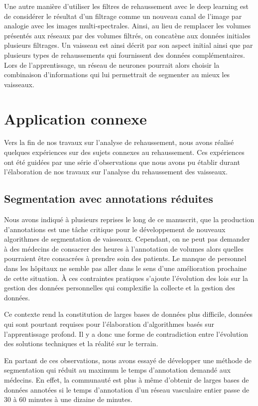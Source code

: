Une autre manière d'utiliser les filtres de rehaussement avec le deep learning est de considérer le résultat d'un filtrage comme un nouveau canal de l’image par analogie avec les images multi-spectrales. Ainsi, au lieu de remplacer les volumes présentés aux réseaux par des volumes filtrés, on concatène aux données initiales plusieurs filtrages. Un vaisseau est ainsi décrit par son aspect initial ainsi que par plusieurs types de rehaussements qui fournissent des données complémentaires. Lors de l'apprentissage, un réseau de neurones pourrait alors choisir la combinaison d'informations qui lui permettrait de segmenter au mieux les vaisseaux. 

\section{Application connexe}
Vers la fin de nos travaux sur l'analyse de rehaussement, nous avons réalisé quelques expériences sur des sujets connexes au rehaussement. Ces expériences ont été guidées par une série d'observations que nous avons pu établir durant l'élaboration de nos travaux sur l'analyse du rehaussement des vaisseaux.
\subsection{Segmentation avec annotations réduites}
Nous avons indiqué à plusieurs reprises le long de ce manuscrit, que la production d'annotations est une tâche critique pour le développement de nouveaux algorithmes de segmentation de vaisseaux. Cependant, on ne peut pas demander à des médecins de consacrer des heures à l'annotation de volumes alors quelles pourraient être consacrées à prendre soin des patients. Le manque de personnel dans les hôpitaux ne semble pas aller dans le sens d'une amélioration prochaine de cette situation. À ces contraintes pratiques s'ajoute l'évolution des lois sur la gestion des données personnelles qui complexifie la collecte et la gestion des données. 

Ce contexte rend la constitution de larges bases de données plus difficile, données qui sont pourtant requises pour l'élaboration d'algorithmes basés sur l'apprentissage profond. Il y a donc une forme de contradiction entre l'évolution des solutions techniques et la réalité sur le terrain.  

En partant de ces observations, nous avons essayé de développer une méthode de segmentation qui réduit au maximum le temps d'annotation demandé aux médecins. En effet, la communauté est plus à même d'obtenir de larges bases de données annotées si le temps d'annotation d'un réseau vasculaire entier passe de 30 à 60 minutes à une dizaine de minutes. 

